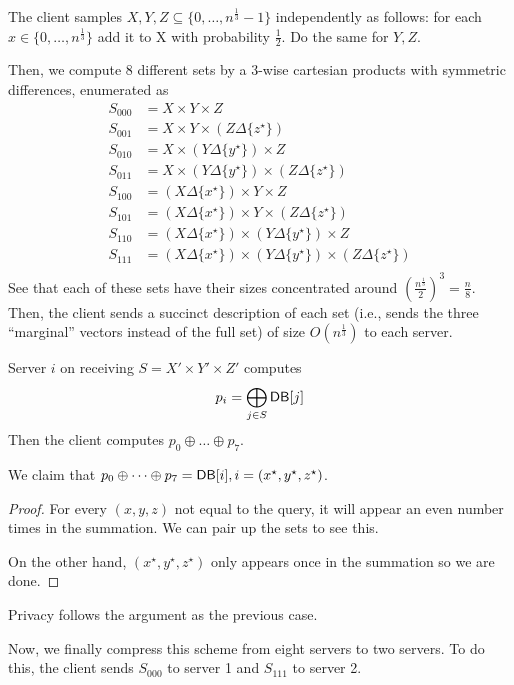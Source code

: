 \begin{enumerate}
		The client samples $X,Y,Z \subseteq \{0, \dots, n^{\frac{1}{3}} - 1\}$ independently as follows: for each $x \in \{0,\dots, n^{\frac{1}{3}}\}$ add it to X with probability $\frac 1 2$. Do the same for $Y,Z$.
	
		Then, we compute $8$ different sets by a 3-wise cartesian products with symmetric differences, enumerated as 
		\begin{align*}
			S_{000} &= X \times Y \times Z \\
			S_{001} &= X \times Y \times (Z \Delta \{z^\star\}) \\
			S_{010} &= X \times (Y \Delta \{y^{\star}\}) \times Z \\
			S_{011} &= X \times (Y \Delta \{y^{\star}\}) \times (Z \Delta \{z^\star\}) \\
			S_{100} &= (X \Delta \{x^{\star}\}) \times Y \times Z \\
			S_{101} &= (X \Delta \{x^{\star}\}) \times Y \times (Z \Delta \{z^\star\}) \\
			S_{110} &= (X \Delta \{x^{\star}\}) \times (Y \Delta \{y^{\star}\}) \times Z \\
			S_{111} &= (X \Delta \{x^{\star}\}) \times (Y \Delta \{y^{\star}\}) \times (Z \Delta \{z^\star\}) \\
		\end{align*}
		See that each of these sets have their sizes concentrated around $\left(\frac{n^{\frac 1 3}}{2}\right)^{3} = \frac n 8$. Then, the client sends a succinct description of each set (i.e., sends the three ``marginal'' vectors instead of the full set) of size $O(n^{\frac 1 3})$ to each server. 

		Server $i$ on receiving $S = X' \times Y' \times Z'$ computes 
			\[p_{i} = \bigoplus_{j \in S} {\sf DB}[j]\]
		Then the client computes $p_0 \oplus \dots \oplus p_7$. 

		We claim that $p_0 \oplus \dots \oplus p_7 = {\sf DB}[i], i = (x^\star, y^\star, z^\star)$.
		\begin{proof}
		For every $(x,y,z)$ not equal to the query, it will appear an even number times in the summation. We can pair up the sets to see this. 

		On the other hand, $(x^\star, y^\star, z^\star)$ only appears once in the summation so we are done.
		\end{proof}

		Privacy follows the argument as the previous case. 
\end{enumerate}

Now, we finally compress this scheme from eight servers to two servers. To do this, the client sends $S_{000}$ to server 1 and $S_{111}$ to server 2.

